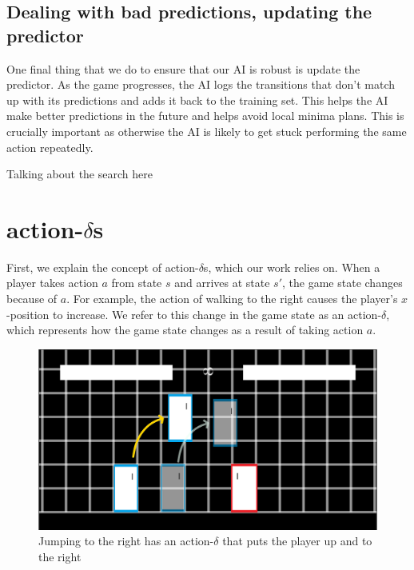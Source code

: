 
\subsection{Dealing with bad predictions, updating the predictor}
One final thing that we do to ensure that our AI is robust is update the predictor. As the game progresses, the AI logs the transitions that don't match up with its predictions and adds it back to the training set. This helps the AI make better predictions in the future and helps avoid local minima plans. This is crucially important as otherwise the AI is likely to get stuck performing the same action repeatedly.

Talking about the search here

\section{action-$\delta$s}
First, we explain the concept of action-$\delta$s, which our work relies on. When a player takes action $a$ from state $s$ and arrives at state $s'$, the game state changes because of $a$. For example, the action of walking to the right causes the player's $x$-position to increase. We refer to this change in the game state as an action-$\delta$, which represents how the game state changes as a result of taking action $a$. 

\begin{figure}[t]
	\centering
	\includegraphics[width=\textwidth]{Figures/ActionDelta.png}
	\caption{Jumping to the right has an action-$\delta$ that puts the player up and to the right}
	\label{}
\end{figure}

